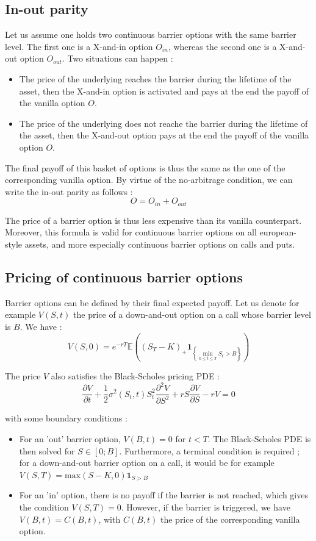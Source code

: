 \documentclass[a4paper,11pt,english]{book}
\begin{document}
\subsection{In-out parity}
Let us assume one holds two continuous barrier options with the same barrier level. The first one is a X-and-in option $O_{in}$, whereas the second one is a X-and-out option $O_{out}$. Two situations can happen : 
\begin{itemize}
    \item The price of the underlying reaches the barrier during the lifetime of the asset, then the X-and-in option is activated and pays at the end the payoff of the vanilla option $O$.
    \item The price of the underlying does not reache the barrier during the lifetime of the asset, then the X-and-out option pays at the end the payoff of the vanilla option $O$.
\end{itemize}

The final payoff of this basket of options is thus the same as the one of the corresponding vanilla option. By virtue of the no-arbitrage condition, we can write the in-out parity as follows : 
$$O = O_{in} + O_{out}$$

The price of a barrier option is thus less expensive than its vanilla counterpart. Moreover, this formula is valid for continuous barrier options on all european-style assets, and more especially continuous barrier options on calls and puts.

\subsection{Pricing of continuous barrier options}
Barrier options can be defined by their final expected payoff. Let us denote for example $V(S,t)$ the price of a down-and-out option on a call whose barrier level is $B$. We have : 
$$V(S,0) = e^{-rT}\mathbb{E}((S_T-K)_+\mathbf{1}_{\left\{\underset{0 \leq t \leq T}{\min} S_t>B\right\}})$$

The price $V$ also satisfies the Black-Scholes pricing PDE :
\begin{equation}
    \frac{\partial V}{\partial t} + \frac{1}{2}\sigma^2(S_t,t)S_t^2 \frac{\partial^2 V}{\partial S^2} + rS\frac{\partial V}{\partial S}-rV=0
    \label{eq:BS-PDE}
\end{equation}


with some boundary conditions :
\begin{itemize}
    \item For an 'out' barrier option, $V(B,t)=0$ for $t<T$. The Black-Scholes PDE is then solved for $S\in[0;B]$. Furthermore, a terminal condition is required ; for a down-and-out barrier option on a call, it would be for example $V(S,T)=\text{max}(S-K,0)\mathbf{1}_{S>B}$
    \item For an 'in' option, there is no payoff if the barrier is not reached, which gives the condition $V(S,T)=0$. However, if the barrier is triggered, we have $V(B,t)=C(B,t)$, with $C(B,t)$ the price of the corresponding vanilla option.
\end{itemize}
\end{document}
